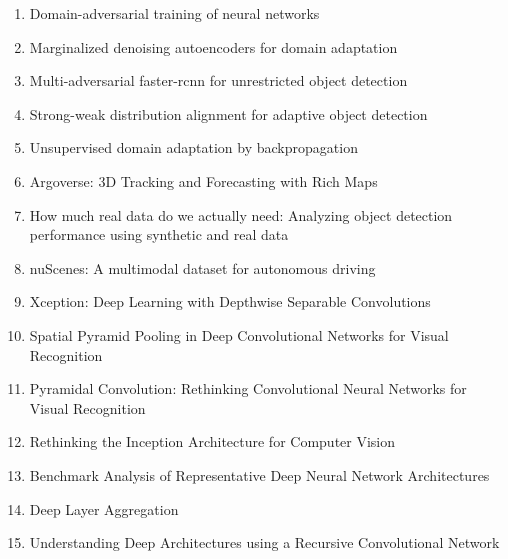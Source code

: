 \documentclass[acmlarge]{acmart}
\begin{document}
\begin{enumerate}
	\item Domain-adversarial training of neural networks \cite{ganin2016domain} 

	\item Marginalized denoising autoencoders for domain adaptation \cite{chen2012marginalized} 

	\item Multi-adversarial faster-rcnn for unrestricted object detection \cite{he2019multi} 

	\item Strong-weak distribution alignment for adaptive object detection \cite{saito2019strong} 

	\item Unsupervised domain adaptation by backpropagation \cite{ganin2015unsupervised} 

	\item Argoverse: 3D Tracking and Forecasting with Rich Maps \cite{chang2019argoverse} 

	\item How much real data do we actually need: Analyzing object detection performance using synthetic and real data \cite{nowruzi2019real} 

	\item nuScenes: A multimodal dataset for autonomous driving \cite{caesar2019nuscenes} 

	\item Xception: Deep Learning with Depthwise Separable Convolutions \cite{chollet2016xception} 

	\item Spatial Pyramid Pooling in Deep Convolutional Networks for Visual Recognition \cite{He_2014} 

	\item Pyramidal Convolution: Rethinking Convolutional Neural Networks for Visual Recognition \cite{duta2020pyramidal} 

	\item Rethinking the Inception Architecture for Computer Vision \cite{szegedy2015rethinking} 

	\item Benchmark Analysis of Representative Deep Neural Network Architectures \cite{Bianco_2018} 

	\item Deep Layer Aggregation \cite{yu2017deep} 

	\item Understanding Deep Architectures using a Recursive Convolutional Network \cite{eigen2013understanding} 


\end{enumerate}
\end{document}
